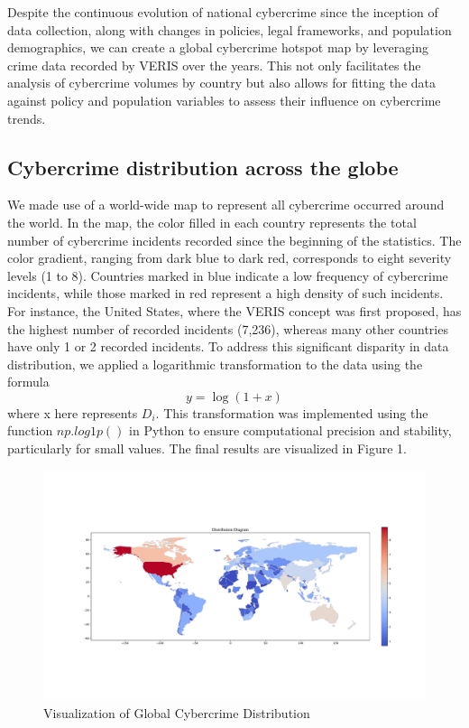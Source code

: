 
Despite the continuous evolution of national cybercrime since the inception of data collection,
along with changes in policies, legal frameworks, and population demographics,
we can create a global cybercrime hotspot map by leveraging crime data recorded by VERIS over the years.
This not only facilitates the analysis of cybercrime volumes by country
but also allows for fitting the data against policy and population variables to assess their influence on cybercrime trends.
\subsection{Cybercrime distribution across the globe}\label{subsec:building-the-hotspot-map} %
	We made use of a world-wide map to represent all cybercrime occurred around the world.
	In the map, the color filled in each country represents the total number of cybercrime incidents recorded since the beginning of the statistics.
	The color gradient, ranging from dark blue to dark red, corresponds to eight severity levels (1 to 8).
	Countries marked in blue indicate a low frequency of cybercrime incidents, while those marked in red represent a high density of such incidents.
	For instance, the United States, where the VERIS concept was first proposed, has the highest number of recorded incidents (7,236),
	whereas many other countries have only 1 or 2 recorded incidents.
	To address this significant disparity in data distribution, we applied a logarithmic transformation to the data using the formula
	\begin{equation}
		y=\log(1+x)\label{eq:3-1-1}
	\end{equation}
	where x here represents $D_i$.
	This transformation was implemented using the function \( np.log1p() \)
	in Python to ensure computational precision and stability, particularly for small values.
	The final results are visualized in Figure 1.
	\begin{figure}[htbp]
		\centering
		\includegraphics[width=1\linewidth]{../rsrc/distributions/Crime_distribution}
		\caption{Visualization of Global Cybercrime Distribution}\label{fig:crime-distribution}
	\end{figure}
